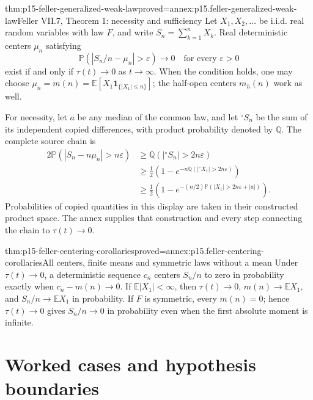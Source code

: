 \begin{hbtheorem}{thm:p15-feller-generalized-weak-law}{proved=annex:p15.feller-generalized-weak-law}{Feller VII.7, Theorem 1: necessity and sufficiency}
Let \(X_1,X_2,\ldots\) be i.i.d. real random variables with law
\(F\), and write \(S_n=\sum_{k=1}^nX_k\). Real deterministic
centers \(\mu_n\) satisfying
\[
 \mathbb P(|S_n/n-\mu_n|>\varepsilon)\longrightarrow0
                           \quad\text{for every }\varepsilon>0
\]
exist if and only if \(\tau(t)\to0\) as \(t\to\infty\).
When the condition holds, one may choose
\(\mu_n=m(n)=\mathbb E[X_1\mathbf1_{\{|X_1|\leq n\}}]\);
the half-open centers \(m_h(n)\) work as well.

For necessity, let \(a\) be any median of the common law, and let
\({}^{\circ}S_n\) be the sum of its independent copied differences,
with product probability denoted by \(\mathbb Q\). The complete source chain is
\[
 \begin{aligned}
 2\mathbb P(|S_n-n\mu_n|>n\varepsilon)
 &\geq\mathbb Q(|{}^{\circ}S_n|>2n\varepsilon)\\
 &\geq\tfrac12\left(1-e^{-n\mathbb Q(|{}^{\circ}X_1|>2n\varepsilon)}\right)\\
 &\geq\tfrac12\left(1-e^{-(n/2)\mathbb P(|X_1|>2n\varepsilon+|a|)}\right).
 \end{aligned}
\]
Probabilities of copied quantities in this display are taken in their
constructed product space. The annex supplies that construction and
every step connecting the chain to \(\tau(t)\to0\).
\end{hbtheorem}

\begin{hbcorollary}{thm:p15-feller-centering-corollaries}{proved=annex:p15.feller-centering-corollaries}{All centers, finite means and symmetric laws without a mean}
Under \(\tau(t)\to0\), a deterministic sequence \(c_n\) centers
\(S_n/n\) to zero in probability exactly when \(c_n-m(n)\to0\).
If \(\mathbb E|X_1|<\infty\), then
\(\tau(t)\to0\), \(m(n)\to\mathbb EX_1\), and
\(S_n/n\to\mathbb EX_1\) in probability.
If \(F\) is symmetric, every \(m(n)=0\); hence \(\tau(t)\to0\)
gives \(S_n/n\to0\) in probability even when the first absolute
moment is infinite.
\end{hbcorollary}

\section{Worked cases and hypothesis boundaries}
\label{sec:p15-feller-worked-cases}


